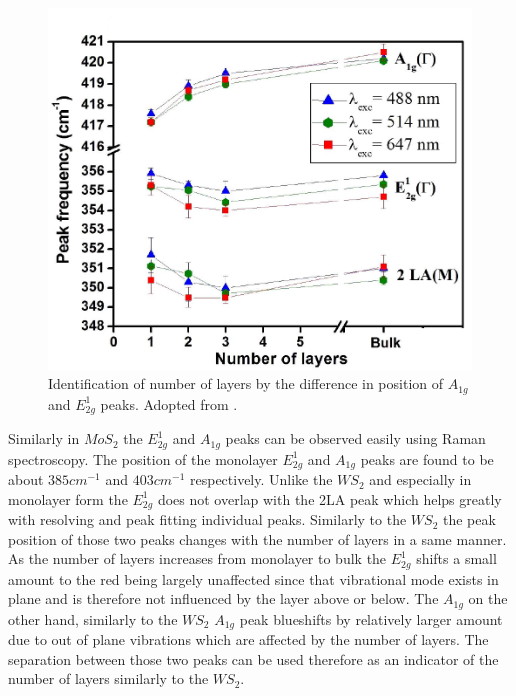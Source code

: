 \begin{figure}[ht]
	\begin{center}
		\includegraphics[scale=0.3]{NumberLayerIdentificationRaman.png}
		\caption{Identification of number of layers by the difference in position of $A_{1g}$ and $E^1_{2g}$ peaks. Adopted from \cite{Berkdemir2013}.}
		\label{fig:LayerNumberIdentificationRamanShiftWS2}
	\end{center}
\end{figure}

\newpage
Similarly in $MoS_2$ the $E^1_{2g}$ and $A_{1g}$ peaks can be observed easily using Raman spectroscopy. The position of the monolayer $E^1_{2g}$ and $A_{1g}$ peaks are found to be about $385 cm^{-1}$ and $403 cm^{-1}$ respectively. Unlike the $WS_2$ and especially in monolayer form the $E^1_{2g}$ does not overlap with the 2LA peak which helps greatly with resolving and peak fitting individual peaks. Similarly to the $WS_2$ the peak position of those two peaks changes with the number of layers in a same manner. As the number of layers increases from monolayer to bulk the $E^1_{2g}$ shifts a small amount to the red being largely unaffected since that vibrational mode exists in plane and is therefore not influenced by the layer above or below. The $A_{1g}$ on the other hand, similarly to the $WS_2$ $A_{1g}$ peak blueshifts by relatively larger amount due to out of plane vibrations which are affected by the number of layers. The separation between those two peaks can be used therefore as an indicator of the number of layers similarly to the $WS_2$. 

